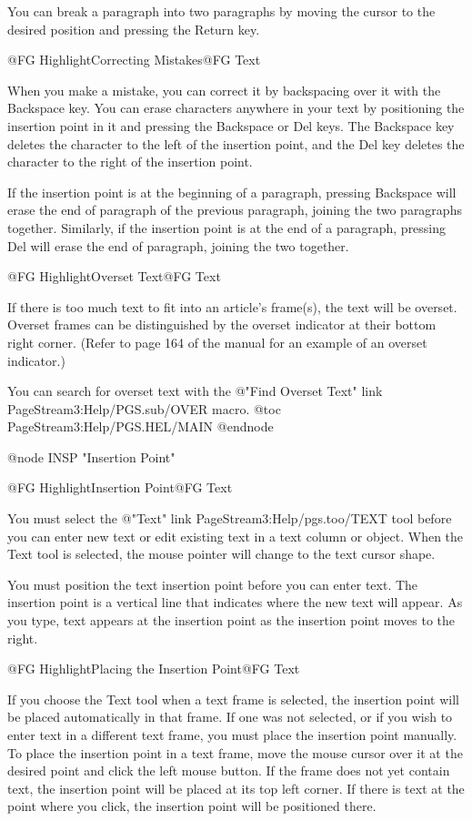 You can break a paragraph into two paragraphs by moving the cursor to the
desired position and pressing the Return key.

@{FG Highlight}Correcting Mistakes@{FG Text}

When you make a mistake, you can correct it by backspacing over it with
the Backspace key. You can erase characters anywhere in your text by
positioning the insertion point in it and pressing the Backspace or Del
keys. The Backspace key deletes the character to the left of the
insertion point, and the Del key deletes the character to the right of
the insertion point.

If the insertion point is at the beginning of a paragraph, pressing
Backspace will erase the end of paragraph of the previous paragraph,
joining the two paragraphs together. Similarly, if the insertion point is
at the end of a paragraph, pressing Del will erase the end of paragraph,
joining the two together.

@{FG Highlight}Overset Text@{FG Text}

If there is too much text to fit into an article's frame(s), the text
will be overset. Overset frames can be distinguished by the overset
indicator at their bottom right corner. (Refer to page 164 of the manual
for an example of an overset indicator.)

You can search for overset text with the @{"Find Overset Text" link PageStream3:Help/PGS.sub/OVER} macro.
@toc PageStream3:Help/PGS.HEL/MAIN
@endnode

@node INSP "Insertion Point"

@{FG Highlight}Insertion Point@{FG Text}

You must select the @{"Text" link PageStream3:Help/pgs.too/TEXT} tool before you can enter new text or edit
existing text in a text column or object. When the Text tool is selected,
the mouse pointer will change to the text cursor shape.

You must position the text insertion point before you can enter text. The
insertion point is a vertical line that indicates where the new text will
appear. As you type, text appears at the insertion point as the insertion
point moves to the right.

@{FG Highlight}Placing the Insertion Point@{FG Text}

If you choose the Text tool when a text frame is selected, the insertion
point will be placed automatically in that frame. If one was not
selected, or if you wish to enter text in a different text frame, you
must place the insertion point manually. To place the insertion point in
a text frame, move the mouse cursor over it at the desired point and
click the left mouse button. If the frame does not yet contain text, the
insertion point will be placed at its top left corner. If there is text
at the point where you click, the insertion point will be positioned
there.


